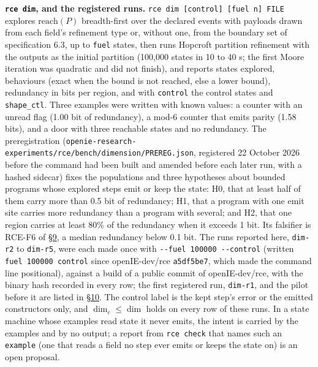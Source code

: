 \documentclass[10pt,letterpaper]{article}
\begin{document}
\textbf{\texttt{rce\ dim}, and the registered runs.}
\texttt{rce\ dim\ {[}control{]}\ {[}fuel\ n{]}\ FILE} explores
\(\mathrm{reach}(P)\) breadth-first over the declared events with
payloads drawn from each field's refinement type or, without one, from
the boundary set of specification 6.3, up to \texttt{fuel} states, then
runs Hopcroft partition refinement with the outputs as the initial
partition (100,000 states in 10 to 40 s; the first Moore iteration was
quadratic and did not finish), and reports states explored, behaviours
(exact when the bound is not reached, else a lower bound), redundancy in
bits per region, and with \texttt{control} the control states and
\texttt{shape\_ctl}. Three examples were written with known values: a
counter with an unread flag (1.00 bit of redundancy), a mod-6 counter
that emits parity (1.58 bits), and a door with three reachable states
and no redundancy. The preregistration
(\texttt{openie-\allowbreak{}research-\allowbreak{}experiments/\allowbreak{}rce/\allowbreak{}bench/\allowbreak{}dimension/\allowbreak{}PREREG.\allowbreak{}json},
registered 22 October 2026 before the command had been built and amended
before each later run, with a hashed sidecar) fixes the populations and
three hypotheses about bounded programs whose explored steps emit or
keep the state: H0, that at least half of them carry more than 0.5 bit
of redundancy; H1, that a program with one emit site carries more
redundancy than a program with several; and H2, that one region carries
at least 80\% of the redundancy when it exceeds 1 bit. Its falsifier is
RCE-F6 of
\href{https://research.openie.dev/papers/rce/\#9-falsifiers}{§9}, a
median redundancy below 0.1 bit. The runs reported here, \texttt{dim-r2}
to \texttt{dim-r5}, were each made once with
\texttt{-\allowbreak{}\/\allowbreak{}-\allowbreak{}fuel\ 100000\ -\allowbreak{}\/\allowbreak{}-\allowbreak{}control} (written
\texttt{fuel\ 100000\ control} since openIE-dev/rce \texttt{a5df5be7},
which made the command line positional), against a build of a public
commit of openIE-dev/rce, with the binary hash recorded in every row;
the first registered run, \texttt{dim-r1}, and the pilot before it are
listed in
\href{https://research.openie.dev/papers/rce/\#10-work-to-finish}{§10}.
The control label is the kept step's error or the emitted constructors
only, and \(\dim_c \le \dim\) holds on every row of these runs. In a
state machine whose examples read state it never emits, the intent is
carried by the examples and by no output; a report from
\texttt{rce\ check} that names such an \texttt{example} (one that reads
a field no step ever emits or keeps the state on) is an open proposal.
\end{document}
